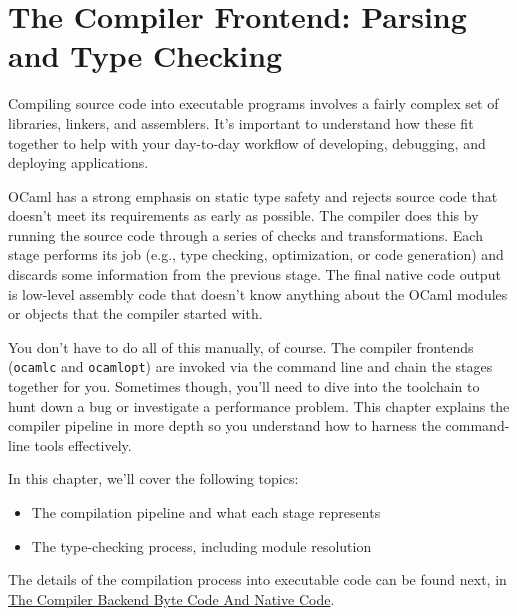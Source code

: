 \hypertarget{the-compiler-frontend-parsing-and-type-checking}{%
\section{\texorpdfstring{The Compiler Frontend: Parsing and {Type
Checking}}{The Compiler Frontend: Parsing and Type Checking}}\label{the-compiler-frontend-parsing-and-type-checking}}

Compiling source code into executable programs involves a fairly complex
set of libraries, linkers, and assemblers. It's important to understand
how these fit together to help with your day-to-day workflow of
developing, debugging, and deploying
applications.

OCaml has a strong emphasis on static type safety and rejects source
code that doesn't meet its requirements as early as possible. The
compiler does this by running the source code through a series of checks
and transformations. Each stage performs its job (e.g., type checking,
optimization, or code generation) and discards some information from the
previous stage. The final native code output is low-level assembly code
that doesn't know anything about the OCaml modules or objects that the
compiler started
with.

You don't have to do all of this manually, of course. The compiler
frontends (\passthrough{\lstinline!ocamlc!} and
\passthrough{\lstinline!ocamlopt!}) are invoked via the command line and
chain the stages together for you. Sometimes though, you'll need to dive
into the toolchain to hunt down a bug or investigate a performance
problem. This chapter explains the compiler pipeline in more depth so
you understand how to harness the command-line tools effectively.

In this chapter, we'll cover the following topics:

\begin{itemize}
\item
  The compilation pipeline and what each stage represents
\item
  The type-checking process, including module resolution
\end{itemize}

The details of the compilation process into executable code can be found
next, in
\href{compiler-backend.html\#the-compiler-backend-byte-code-and-native-code}{The
Compiler Backend Byte Code And Native Code}.


